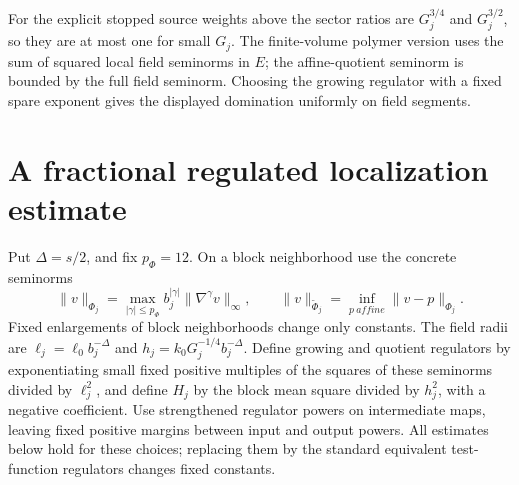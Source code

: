 \documentclass[11pt]{article}
\begin{document}
For the explicit stopped source weights above the sector ratios are
\(G_j^{3/4}\) and \(G_j^{3/2}\), so they are at most one for small
\(G_j\). The finite-volume polymer version uses the sum of squared
local field seminorms in \(E\); the affine-quotient seminorm is bounded
by the full field seminorm. Choosing the growing regulator with a fixed
spare exponent gives the displayed domination uniformly on field segments.

\section{A fractional regulated localization estimate}
\label{completion:regulated-localization}
Put \(\Delta=s/2\), and fix \(p_\Phi=12\). On a block
neighborhood use the concrete seminorms
\[
 \|v\|_{\Phi_j}=\max_{|\gamma|\le p_\Phi}
                      b_j^{|\gamma|}\|\nabla^\gamma v\|_\infty,
 \qquad
 \|v\|_{\widetilde\Phi_j}=\inf_{p\ {
 affine}}\|v-p\|_{\Phi_j}.
\]
Fixed enlargements of block neighborhoods change only constants.
The field radii are \(\ell_j=\ell_0b_j^{-\Delta}\) and
\(h_j=k_0G_j^{-1/4}b_j^{-\Delta}\). Define growing and quotient
regulators by exponentiating small fixed positive multiples of the
squares of these seminorms divided by \(\ell_j^2\), and define
\(H_j\) by the block mean square divided by \(h_j^2\), with a
negative coefficient. Use strengthened regulator powers on intermediate
maps, leaving fixed positive margins between input and output powers.
All estimates below hold for these choices; replacing them by the
standard equivalent test-function regulators changes fixed constants.
\end{document}
